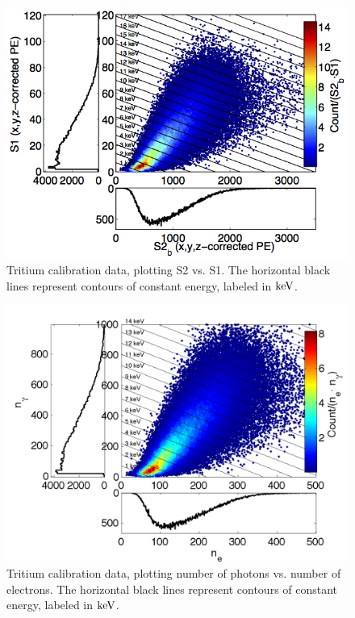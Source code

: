 \begin{figure}[p!]\centering
\includegraphics[width=140mm]{Chapter_E_Scale/Figures/T_new/S2S1_T_.png}
\caption{Tritium calibration data, plotting S2 vs. S1. The horizontal black lines represent contours of constant energy, labeled in $\rm keV$. }
\label{fig:T_S2S1}
\end{figure}

\begin{figure}[h!]\centering
\includegraphics[width=140mm]{Chapter_E_Scale/Figures/T_new/NeNg_T_.png}
\caption{Tritium calibration data, plotting number of photons vs. number of electrons. The horizontal black lines represent contours of constant energy, labeled in $\rm keV$. }
\label{fig:T_NeNg2}
\end{figure}

